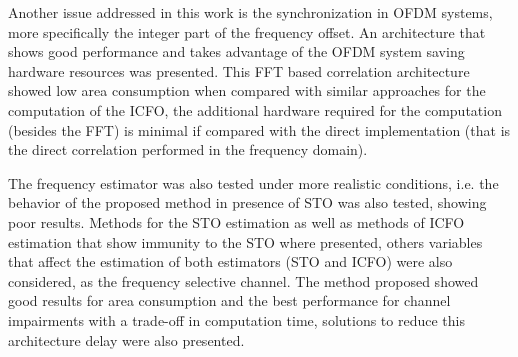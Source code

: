 
Another issue addressed in this work is the synchronization in OFDM systems, more specifically the integer part of the frequency offset. An architecture that shows good performance and takes advantage of the OFDM system saving hardware resources was presented. This FFT based correlation architecture showed low area consumption when compared with similar approaches for the computation of the ICFO, the additional hardware required for the computation (besides the FFT) is minimal if compared with the direct implementation (that is the direct correlation performed in the frequency domain). 

The frequency estimator was also tested under more realistic conditions, i.e. the behavior of the proposed method in presence of STO was also tested, showing poor results. Methods for the STO estimation as well as methods of ICFO estimation that show immunity to the STO where presented, others variables that affect the estimation of both estimators (STO and ICFO) were also considered, as the frequency selective channel. The method proposed showed good results for area consumption and the best performance for channel impairments with a trade-off in computation time, solutions to reduce this architecture delay were also presented.  

 





